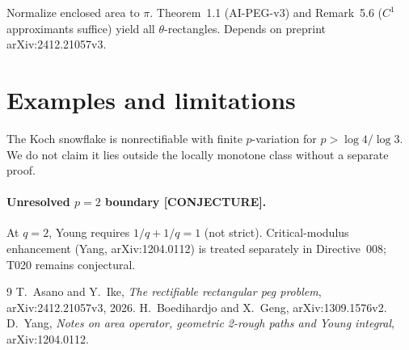 \documentclass[11pt]{article}
\theoremstyle{definition}
\theoremstyle{remark}
\newcommand{\tagconj}{\textsf{\footnotesize[CONJECTURE]}}
\begin{document}
Normalize enclosed area to $\pi$. Theorem~1.1 (AI-PEG-v3) and Remark~5.6
($C^1$ approximants suffice) yield all $\theta$-rectangles.
Depends on preprint arXiv:2412.21057v3.

\section{Examples and limitations}\label{sec:limit}

The Koch snowflake is nonrectifiable with finite $p$-variation for
$p>\log 4/\log 3$. We do not claim it lies outside the locally monotone
class without a separate proof.

\paragraph{Unresolved $p=2$ boundary \tagconj.}
At $q=2$, Young requires $1/q+1/q=1$ (not strict).
Critical-modulus enhancement (Yang, arXiv:1204.0112) is treated separately
in Directive~008; T020 remains conjectural.


\begin{thebibliography}{9}
T.~Asano and Y.~Ike,
\textit{The rectifiable rectangular peg problem},
arXiv:2412.21057v3, 2026.
H.~Boedihardjo and X.~Geng,
arXiv:1309.1576v2.
D.~Yang,
\textit{Notes on area operator, geometric 2-rough paths and Young integral},
arXiv:1204.0112.
\end{thebibliography}
\end{document}

